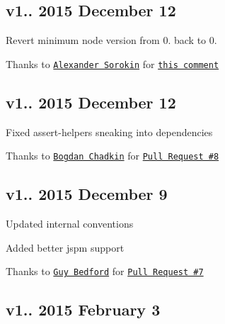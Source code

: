 \subsection*{v1.. 2015 December 12}


\begin{DoxyItemize}
\item Revert minimum node version from 0. back to 0.
\begin{DoxyItemize}
\item Thanks to \href{https://github.com/syrnick}{\tt Alexander Sorokin} for \href{https://github.com/bevry/domain-browser/commit/c66ee3445e87955e70d0d60d4515f2d26a81b9c4#commitcomment-14938325}{\tt this comment}
\end{DoxyItemize}
\end{DoxyItemize}

\subsection*{v1.. 2015 December 12}


\begin{DoxyItemize}
\item Fixed {\ttfamily assert-\/helpers} sneaking into {\ttfamily dependencies}
\begin{DoxyItemize}
\item Thanks to \href{https://github.com/TrySound}{\tt Bogdan Chadkin} for \href{https://github.com/bevry/domain-browser/pull/8}{\tt Pull Request \#8}
\end{DoxyItemize}
\end{DoxyItemize}

\subsection*{v1.. 2015 December 9}


\begin{DoxyItemize}
\item Updated internal conventions
\item Added better jspm support
\begin{DoxyItemize}
\item Thanks to \href{https://github.com/guybedford}{\tt Guy Bedford} for \href{https://github.com/bevry/domain-browser/pull/7}{\tt Pull Request \#7}
\end{DoxyItemize}
\end{DoxyItemize}

\subsection*{v1.. 2015 February 3}


